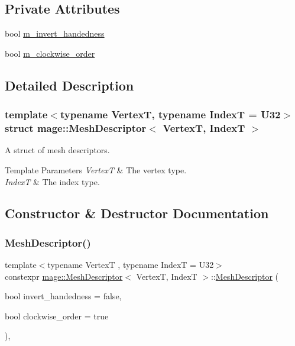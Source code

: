 \subsection*{Private Attributes}
\begin{DoxyCompactItemize}
\item 
bool \hyperlink{structmage_1_1_mesh_descriptor_a95491d0719f524589192d74fe5622bf8}{m\+\_\+invert\+\_\+handedness}
\item 
bool \hyperlink{structmage_1_1_mesh_descriptor_aa64fd6421b27729a6b27ad0c2b70af1e}{m\+\_\+clockwise\+\_\+order}
\end{DoxyCompactItemize}


\subsection{Detailed Description}
\subsubsection*{template$<$typename VertexT, typename IndexT = U32$>$\newline
struct mage\+::\+Mesh\+Descriptor$<$ Vertex\+T, Index\+T $>$}

A struct of mesh descriptors.


\begin{DoxyTemplParams}{Template Parameters}
{\em VertexT} & The vertex type. \\
\hline
{\em IndexT} & The index type. \\
\hline
\end{DoxyTemplParams}


\subsection{Constructor \& Destructor Documentation}
\hypertarget{structmage_1_1_mesh_descriptor_aab7cab220ecd16b78209000664c74231}{}\label{structmage_1_1_mesh_descriptor_aab7cab220ecd16b78209000664c74231} 
\subsubsection{\texorpdfstring{Mesh\+Descriptor()}{MeshDescriptor()}\hspace{0.1cm}{\footnotesize\ttfamily [1/3]}}
{\footnotesize\ttfamily template$<$typename VertexT , typename IndexT  = U32$>$ \\
constexpr \hyperlink{structmage_1_1_mesh_descriptor}{mage\+::\+Mesh\+Descriptor}$<$ VertexT, IndexT $>$\+::\hyperlink{structmage_1_1_mesh_descriptor}{Mesh\+Descriptor} (\begin{DoxyParamCaption}\item[{bool}]{invert\+\_\+handedness = {\ttfamily false},  }\item[{bool}]{clockwise\+\_\+order = {\ttfamily true} }\end{DoxyParamCaption})\hspace{0.3cm}{\ttfamily [explicit]}, {\ttfamily [noexcept]}}

